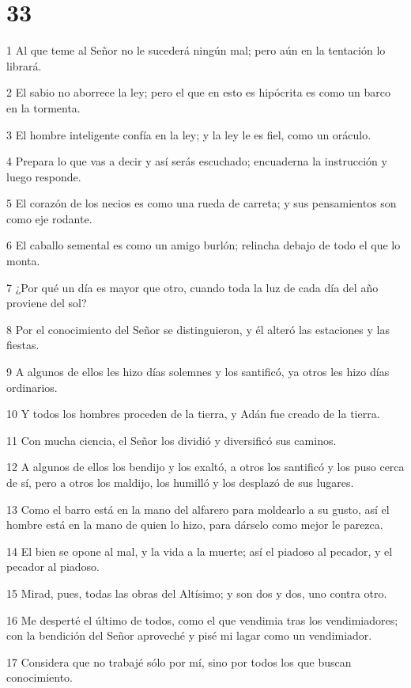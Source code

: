\chapter{33}

\par 1 Al que teme al Señor no le sucederá ningún mal; pero aún en la tentación lo librará.
\par 2 El sabio no aborrece la ley; pero el que en esto es hipócrita es como un barco en la tormenta.
\par 3 El hombre inteligente confía en la ley; y la ley le es fiel, como un oráculo.
\par 4 Prepara lo que vas a decir y así serás escuchado; encuaderna la instrucción y luego responde.
\par 5 El corazón de los necios es como una rueda de carreta; y sus pensamientos son como eje rodante.
\par 6 El caballo semental es como un amigo burlón; relincha debajo de todo el que lo monta.
\par 7 ¿Por qué un día es mayor que otro, cuando toda la luz de cada día del año proviene del sol?
\par 8 Por el conocimiento del Señor se distinguieron, y él alteró las estaciones y las fiestas.
\par 9 A algunos de ellos les hizo días solemnes y los santificó, ya otros les hizo días ordinarios.
\par 10 Y todos los hombres proceden de la tierra, y Adán fue creado de la tierra.
\par 11 Con mucha ciencia, el Señor los dividió y diversificó sus caminos.
\par 12 A algunos de ellos los bendijo y los exaltó, a otros los santificó y los puso cerca de sí, pero a otros los maldijo, los humilló y los desplazó de sus lugares.
\par 13 Como el barro está en la mano del alfarero para moldearlo a su gusto, así el hombre está en la mano de quien lo hizo, para dárselo como mejor le parezca.
\par 14 El bien se opone al mal, y la vida a la muerte; así el piadoso al pecador, y el pecador al piadoso.
\par 15 Mirad, pues, todas las obras del Altísimo; y son dos y dos, uno contra otro.
\par 16 Me desperté el último de todos, como el que vendimia tras los vendimiadores; con la bendición del Señor aproveché y pisé mi lagar como un vendimiador.
\par 17 Considera que no trabajé sólo por mí, sino por todos los que buscan conocimiento.
